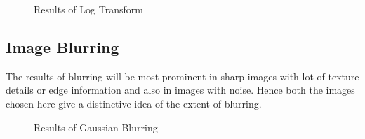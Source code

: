\documentclass[letterpaper, 10 pt, conference]{ieeeconf}  %
\begin{document}
\begin{figure}[h!]%
	\centering
    \qquad
    \caption{Results of Log Transform}%
    \label{fig:log_transform}%
\end{figure}

\subsection{\textbf{Image Blurring}}
The results of blurring will be most prominent in sharp images with lot of texture details or edge information and also in images with noise. Hence both the images chosen here give a distinctive idea of the extent of blurring. 

\begin{figure}[h!]%
	\centering
    \qquad
    \caption{Results of Gaussian Blurring}%
    \label{fig:image_blur1}%
\end{figure}
\end{document}
